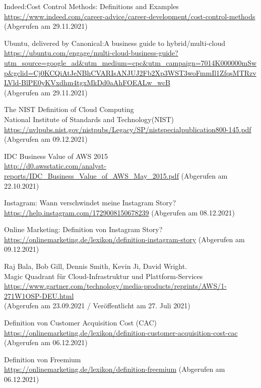 \begin{thebibliography}{HR08}
 Indeed:Cost Control Methods: Definitions and Examples\\
\url{https://www.indeed.com/career-advice/career-development/cost-control-methods}\\
  (Abgerufen am 29.11.2021)

   Ubuntu, delivered by Canonical:A business guide to hybrid/multi-cloud\\
  \url{https://ubuntu.com/engage/multi-cloud-business-guide?utm_source=google_ad&utm_medium=cpc&utm_campaign=7014K000000mSwp&gclid=Cj0KCQiAtJeNBhCVARIsANJUJ2Fb2Xp3WST3woFmmIl1ZfqsMTRzvLVld-BlPE0yKVxdhm4tgxMkDd0aAhFOEALw_wcB}\\
  (Abgerufen am 29.11.2021)

  The NIST Definition of Cloud Computing\\
  National Institute of Standards and Technology(NIST)
  \url{https://nvlpubs.nist.gov/nistpubs/Legacy/SP/nistspecialpublication800-145.pdf}\\
  (Abgerufen am 09.12.2021)

   IDC Business Value of AWS 2015\\
 \url{http://d0.awsstatic.com/analyst-reports/IDC_Business_Value_of_AWS_May_2015.pdf}
 (Abgerufen am 22.10.2021)

   Instagram: Wann verschwindet meine Instagram Story?\\
 \url{https://help.instagram.com/1729008150678239}
 (Abgerufen am 08.12.2021)

  Online Marketing: Definition von Instagram Story?\\
 \url{https://onlinemarketing.de/lexikon/definition-instagram-story}
 (Abgerufen am 09.12.2021)

 Raj Bala, Bob Gill, Dennis Smith, Kevin Ji, David Wright.\\ 
  Magic Quadrant für Cloud-Infrastruktur und Plattform-Services\\
  \url{https://www.gartner.com/technology/media-products/reprints/AWS/1-271W1OSP-DEU.html}
  \\(Abgerufen am 23.09.2021 / Veröffentlicht am 27. Juli 2021)

 Definition von Customer Acquisition Cost (CAC)\\
 \url{https://onlinemarketing.de/lexikon/definition-customer-acquisition-cost-cac}
 (Abgerufen am 06.12.2021)

  Definition von Freemium\\
 \url{https://onlinemarketing.de/lexikon/definition-freemium}
 (Abgerufen am 06.12.2021)
  

\end{thebibliography}
